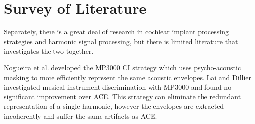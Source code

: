 \documentclass [11pt, proquest,oneside] {ganter_thesis}[2015/03/03]
\begin{document}










\section{Survey of Literature}

Separately, there is a great deal of research in cochlear implant processing strategies and harmonic signal processing, but there is limited literature that investigates the two together.

Nogueira et al. \cite{nogueira2005psychoacoustic} developed the MP3000 CI strategy which uses psycho-acoustic masking to more efficiently represent the same acoustic envelopes.  Lai and Dillier \cite{lai2008investigating} investigated musical instrument discrimination with MP3000 and found no significant improvement over ACE.  This strategy can eliminate the redundant representation of a single harmonic, however the envelopes are extracted incoherently and suffer the same artifacts as ACE.
\end{document}
